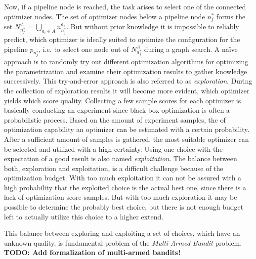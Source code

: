 Now, if a pipeline node is reached, the task arises to select one of the connected optimizer nodes.
The set of optimizer nodes below a pipeline node $n^*_j$ forms the set $N^A_{n^*_j} = \bigcup_{a_i \in A} n^{a_i}_{n^*_j}$.
But without prior knowledge it is impossible to reliably predict, which optimizer is ideally suited to optimize the configuration for the pipeline $p_{n^*_j}$, i.e. to select one node out of $N^A_{n^*_j}$ during a graph search.\newline
A na\"ive approach is to randomly try out different optimization algorithms for optimizing the parametrization and examine their optimization results to gather knowledge successively.
This try-and-error approach is also referred to as \textit{exploration}.
During the collection of exploration results it will become more evident, which optimizer yields which score quality.\newline
Collecting a few sample scores for each optimizer is basically conducting an experiment since black-box optimization is often a probabilistic process.
Based on the amount of experiment samples, the of optimization capability an optimizer can be estimated with a certain probability.
After a sufficient amount of samples is gathered, the most suitable optimizer can be selected and utilized with a high certainty.
Using one choice with the expectation of a good result is also named \textit{exploitation}.\newline
The balance between both, exploration and exploitation, is a difficult challenge because of the optimization budget.
With too much exploitation it can not be assured with a high probability that the exploited choice is the actual best one, since there is a lack of optimization score samples.
But with too much exploration it may be possible to determine the probably best choice, but there is not enough budget left to actually utilize this choice to a higher extend.

This balance between exploring and exploiting a set of choices, which have an unknown quality, is fundamental problem of the \textit{Multi-Armed Bandit} problem.
\textbf{TODO: Add formalization of multi-armed bandits!}

